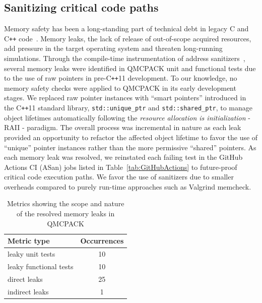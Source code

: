 \subsection{Sanitizing critical code paths}

Memory safety has been a long-standing part of technical debt in legacy C and C\texttt{++} code~\cite{10.1145/3129743.3129745}.
Memory leaks, the lack of release of out-of-scope acquired resources, add pressure in the target operating system and threaten long-running simulations.
Through the compile-time instrumentation of address sanitizers~\cite{serebryany2012addresssanitizer}, several memory leaks were identified in QMCPACK unit and functional tests due to the use of raw pointers in pre-C\texttt{++}11 development.
To our knowledge, no memory safety checks were applied to QMCPACK in its early development stages.
We replaced raw pointer instances with ``smart pointers'' introduced in the C\texttt{++}11 standard library, \texttt{std::unique\_ptr} and \texttt{std::shared\_ptr}, to manage object lifetimes automatically following the \emph{resource allocation is initialization} - RAII - paradigm.
The overall process was incremental in nature as each leak provided an opportunity to refactor the affected
object lifetime to favor the use of ``unique'' pointer instances rather than the more permissive ``shared'' pointers.
As each memory leak was resolved, we reinstated each failing test in the GitHub Actions CI (ASan) jobs listed in Table~\ref{tab:GitHubActions} to future-proof critical code execution paths.
We favor the use of sanitizers due to smaller overheads compared to purely run-time approaches such as Valgrind memcheck. 

\begin{table}[h]
\centering
\begin{tabular}{|l|c|}
\hline
Metric type & Occurrences  \\
\hline
leaky unit tests                  & 10   \\
leaky functional tests            & 10   \\
direct leaks                      & 25   \\
indirect leaks                    &  1    \\
\hline 
\end{tabular}
\caption{Metrics showing the scope and nature of the resolved memory leaks in QMCPACK}
\label{tab:leaks}
\end{table}

